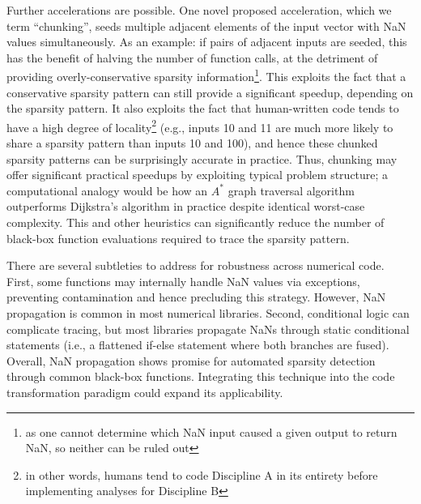 Further accelerations are possible. One novel proposed acceleration, which we term ``chunking'', seeds multiple adjacent elements of the input vector with NaN values simultaneously. As an example: if pairs of adjacent inputs are seeded, this has the benefit of halving the number of function calls, at the detriment of providing overly-conservative sparsity information\footnote{as one cannot determine which NaN input caused a given output to return NaN, so neither can be ruled out}. This exploits the fact that a conservative sparsity pattern can still provide a significant speedup, depending on the sparsity pattern. It also exploits the fact that human-written code tends to have a high degree of locality\footnote{in other words, humans tend to code Discipline A in its entirety before implementing analyses for Discipline B} (e.g., inputs 10 and 11 are much more likely to share a sparsity pattern than inputs 10 and 100), and hence these chunked sparsity patterns can be surprisingly accurate in practice. Thus, chunking may offer significant practical speedups by exploiting typical problem structure; a computational analogy would be how an $A^*$ graph traversal algorithm outperforms Dijkstra's algorithm in practice despite identical worst-case complexity. This and other heuristics can significantly reduce the number of black-box function evaluations required to trace the sparsity pattern.

There are several subtleties to address for robustness across numerical code. First, some functions may internally handle NaN values via exceptions, preventing contamination and hence precluding this strategy. However, NaN propagation is common in most numerical libraries. Second, conditional logic can complicate tracing, but most libraries propagate NaNs through static conditional statements (i.e., a flattened if-else statement where both branches are fused). Overall, NaN propagation shows promise for automated sparsity detection through common black-box functions. Integrating this technique into the code transformation paradigm could expand its applicability.
